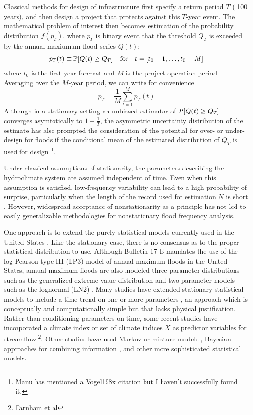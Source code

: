 \documentclass[12pt]{article}
\begin{document}
Classical methods for design of infrastructure first specify a return period \(T\) (\ie{} 100 years), and then design a project that protects against this \(T\)-year event.
The mathematical problem of interest then becomes estimation of the probability distribution \( f(p_T) \), where \( p_T \) is binary event that the threshold \( Q_T \) is exceeded by the annual-maxiumum flood series \( Q(t) \):
\begin{equation}
  p_T(t) \equiv \probability \qty[ Q(t) \geq Q_T] \qqtext{for} t = \qty[t_0 + 1, \ldots, t_0 + M]
\end{equation}
where \( t_0 \) is the first year forecast and \( M \) is the project operation period.
Averaging over the \(M\)-year period, we can write for convenience
\begin{equation}
  p_T = \frac{1}{M} \sum_{t=1}^{M} p_T(t)
\end{equation}
Although in a stationary setting an unbiased estimator of \( P \qty[ Q(t) \geq Q_T] \) converges asymtotically to \(1 - \frac{1}{T}\), the asymmetric uncertainty distribution of the estimate has also prompted the consideration of the potential for over- or under-design for floods if the conditional mean of the estimated distribution of \( Q_T \) is used for design \citep{Stedinger1997}\footnote{Manu has mentioned a Vogel198x citation but I haven't successfully found it.}.

Under classical assumptions of stationarity, the parameters describing the hydroclimate system are assumed independent of time.
Even when this assumption is satisfied, low-frequency variability can lead to a high probability of surprise, particularly when the length of the record used for estimation \(N\) is short \citep{Jain2001,Matalas2012}.
However, widespread acceptance of nonstationarity as a principle has not led to easily generalizable methodologies for nonstationary flood frequency analysis.

One approach is to extend the purely statistical models currently used in the United States \citep{IACWD1982}.
Like the stationary case, there is no consensus as to the proper statistical distribution to use.
Although Bulletin 17-B \citep{IACWD1982} mandates the use of the log-Pearson type III (LP3) model of annual-maximum floods in the United States, annual-maximum floods are also modeled three-parameter distributions such as the generalized extreme value distribution and two-parameter models such as the lognormal (LN2) \citep{Vogel1996}.
Many studies have extended stationary statistical models to include a time trend on one or more parameters \citep{Obeysekera2014,Vogel2011,Serinaldi2015,Strupczewski2001}, an approach which is conceptually and computationally simple but that lacks physical justification.
Rather than conditioning parameters on time, some recent studies have incorporated a climate index or set of climate indices \(X\) as predictor variables for streamflow \citep{Delgado2014,Silva2016,Sun2014,Griffis2007}\footnote{Farnham et al}.
Other studies have used Markov or mixture models \citep{Waylen1986,Sveinsson2005,Griffis2007}, Bayesian approaches for combining information \citep{Lima2016,Bracken2017}, and other more sophisticated statistical models.
\end{document}
